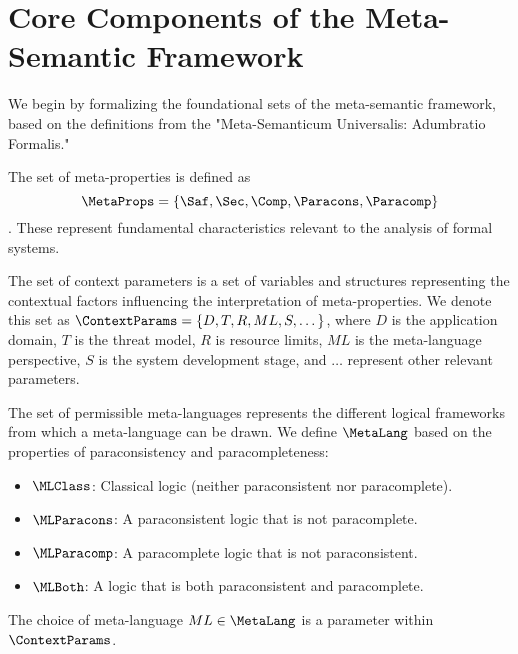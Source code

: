 	\section{Core Components of the Meta-Semantic Framework}
	
	We begin by formalizing the foundational sets of the meta-semantic framework, based on the definitions from the "Meta-Semanticum Universalis: Adumbratio Formalis."
	
	\begin{definition}
		The set of meta-properties is defined as $$\MetaProps = \{ \Saf, \Sec, \Comp, \Paracons, \Paracomp \}$$. These represent fundamental characteristics relevant to the analysis of formal systems.
	\end{definition}
	
	\begin{definition}
		The set of context parameters is a set of variables and structures representing the contextual factors influencing the interpretation of meta-properties. We denote this set as $\ContextParams = \{ D, T, R, ML, S, \dots \}$, where $D$ is the application domain, $T$ is the threat model, $R$ is resource limits, $ML$ is the meta-language perspective, $S$ is the system development stage, and $\dots$ represent other relevant parameters.
	\end{definition}
	
	\begin{definition}
		The set of permissible meta-languages represents the different logical frameworks from which a meta-language can be drawn. We define $\MetaLang$ based on the properties of paraconsistency and paracompleteness:
		\begin{itemize}[nosep] %
			\item $\MLClass$: Classical logic (neither paraconsistent nor paracomplete).
			\item $\MLParacons$: A paraconsistent logic that is not paracomplete.
			\item $\MLParacomp$: A paracomplete logic that is not paraconsistent.
			\item $\MLBoth$: A logic that is both paraconsistent and paracomplete.
		\end{itemize}
		The choice of meta-language $ML \in \MetaLang$ is a parameter within $\ContextParams$.
	\end{definition}
	
